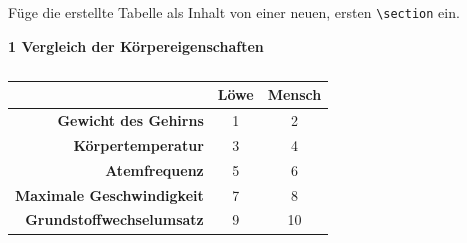 \documentclass["WS\space 16-17\space -\space LaTeX-Kurs\space -\space Praesentation\space -\space 2.tex"]{subfiles}
\begin{document}
\begin{frame}[fragile]
	\vspace{-0.3cm}
	\begin{Aufgabe}
		\vspace{-0.1cm}
		Füge die erstellte Tabelle als Inhalt von einer neuen, ersten \lstinline[basicstyle=\normalfont\ttfamily\normalsize]|\section| \textrm{} ein.
	\end{Aufgabe}
	\begin{outputbox}
		{\LARGE \textbf{1 Vergleich der Körpereigenschaften}}
		\vspace{-0.3cm}
		\begin{center}
\begin{table}[htbp] 
	\caption{}
	\centering
	\begin{tabular}{|r|c|c|}
		\hline 
		\textbf{} & \textbf{Löwe} & \textbf{Mensch} \\ \hline 
		\textbf{Gewicht des Gehirns} & 1 & 2 \\ \hline 
		\textbf{Körpertemperatur} & 3 & 4 \\ \hline 
		\textbf{Atemfrequenz} & 5 & 6 \\ \hline 
		\textbf{Maximale Geschwindigkeit} & 7 & 8 \\ \hline 
		\textbf{Grundstoffwechselumsatz} & 9 & 10 \\ \hline
	\end{tabular} 
	\label{}
\end{table}
		\end{center}
		\vspace{-0.4cm}
	\end{outputbox}

\end{frame}
\end{document}
